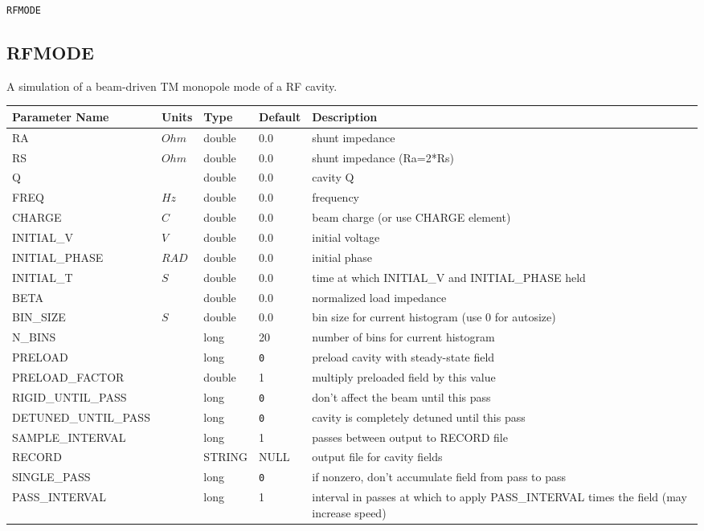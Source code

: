 \begin{latexonly}
\newpage
\begin{center}{\Large\verb|RFMODE|}\end{center}
\end{latexonly}\subsection{RFMODE}
A simulation of a beam-driven TM monopole mode of a RF cavity.
\\
\begin{tabular}{|l|l|l|l|p{\descwidth}|} \hline
Parameter Name & Units & Type & Default & Description \\ \hline 
RA & $Ohm$ & double &  0.0 & shunt impedance  \\ \hline 
RS & $Ohm$ & double &  0.0 & shunt impedance (Ra=2*Rs)  \\ \hline 
Q &  & double &  0.0 & cavity Q  \\ \hline 
FREQ & $Hz$ & double &  0.0 & frequency  \\ \hline 
CHARGE & $C$ & double &  0.0 & beam charge (or use CHARGE element)  \\ \hline 
INITIAL\_V & $V$ & double &  0.0 & initial voltage  \\ \hline 
INITIAL\_PHASE & $RAD$ & double &  0.0 & initial phase  \\ \hline 
INITIAL\_T & $S$ & double &  0.0 & time at which INITIAL\_V and INITIAL\_PHASE held  \\ \hline 
BETA &  & double &  0.0 & normalized load impedance  \\ \hline 
BIN\_SIZE & $S$ & double &  0.0 & bin size for current histogram (use 0 for autosize)  \\ \hline 
N\_BINS &  & long &   20              & number of bins for current histogram  \\ \hline 
PRELOAD &  & long &  \verb|0| & preload cavity with steady-state field  \\ \hline 
PRELOAD\_FACTOR &  & double &   1 & multiply preloaded field by this value  \\ \hline 
RIGID\_UNTIL\_PASS &  & long &  \verb|0| & don't affect the beam until this pass  \\ \hline 
DETUNED\_UNTIL\_PASS &  & long &  \verb|0| & cavity is completely detuned until this pass  \\ \hline 
SAMPLE\_INTERVAL &  & long &   1               & passes between output to RECORD file  \\ \hline 
RECORD &  & STRING &   NULL            & output file for cavity fields  \\ \hline 
SINGLE\_PASS &  & long &  \verb|0| & if nonzero, don't accumulate field from pass to pass  \\ \hline 
PASS\_INTERVAL &  & long &   1               & interval in passes at which to apply PASS\_INTERVAL times the field (may increase speed)  \\ \hline 
\end{tabular}

